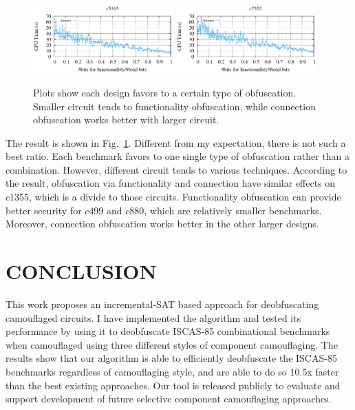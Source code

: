 \documentclass[thesis]{umassthesis}  %
\begin{document}
\begin{figure}[!hbt]
    \includegraphics[width=0.48\textwidth]{DEFENSE_DATA/c5315.eps} \hspace{.3cm}
    \includegraphics[width=0.48\textwidth]{DEFENSE_DATA/c7552.eps}

    \caption{Plots show each design favors to a certain type of obfuscation. Smaller circuit tends to functionality obfuscation, while connection obfuscation works better with larger circuit.}
    \label{fig:eva_mix}
\end{figure}

The result is shown in Fig.~\ref{fig:eva_mix}.  Different from my expectation, there is not such a best ratio. Each benchmark favors to one single type of obfuscation rather than a combination. However, different circuit tends to various techniques. According to the result, obfuscation via functionality and connection have similar effects on $c1355$, which is a divide to those circuits. Functionality obfuscation can provide better security for $c499$ and $c880$, which are relatively smaller benchmarks. Moreover, connection obfuscation works better in the other larger designs.

\chapter{CONCLUSION}


This work proposes an incremental-SAT based approach for deobfuscating camouflaged circuits. I have implemented the algorithm and tested its performance by using it to deobfuscate ISCAS-85 combinational benchmarks when camouflaged using three different styles of component camouflaging. The results show that our algorithm is able to efficiently deobfuscate the ISCAS-85 benchmarks regardless of camouflaging style, and are able to do so 10.5x faster than the best existing approaches. Our tool is released publicly to evaluate and support development of future selective component camouflaging approaches. 
\end{document}
